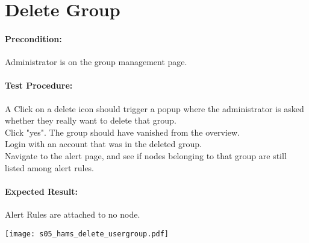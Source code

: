 \documentclass{scrreprt}
\begin{document}
\begin{minipage}[c]{0.4\textwidth}
\section{Delete Group}

\paragraph{Precondition:}
Administrator is on the group management page.\\

\paragraph{Test Procedure:}
A Click on a delete icon should trigger a popup where the administrator is asked whether they really want to delete that group.\\
Click "yes". The group should have vanished from the overview.\\
Login with an account that was in the deleted group.\\
Navigate to the alert page, and see if nodes belonging to that group are still listed among alert rules.\\

\paragraph{Expected Result:}
Alert Rules are attached to no node.

\end{minipage}
\hfill
\begin{minipage}[c]{0.5\textwidth}
	\texttt{[image: s05\_hams\_delete\_usergroup.pdf]}
\end{minipage}
\end{document}
